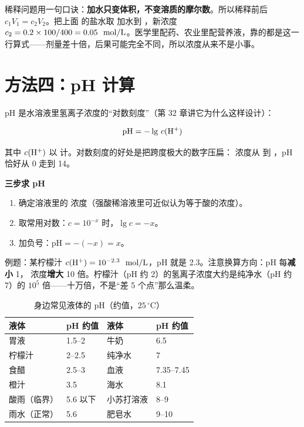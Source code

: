 稀释问题用一句口诀：\textbf{加水只变体积，不变溶质的摩尔数}。所以稀释前后 $c_1V_1 = c_2V_2$。把上面  的盐水取  加水到 ，新浓度 $c_2 = 0.2\times100/400 = 0.05\ \ud{}{mol/L}$。医学里配药、农业里配营养液，靠的都是这一行算式——剂量差十倍，后果可能完全不同，所以浓度从来不是小事。

\section{方法四：pH 计算}

pH 是水溶液里氢离子浓度的“对数刻度”（第 32 章讲它为什么这样设计）：

\[
\mathrm{pH} = -\lg\,c(\mathrm{H^+})
\]

其中 $c(\mathrm{H^+})$ 以  计。对数刻度的好处是把跨度极大的数字压扁： 浓度从  到 ，pH 恰好从 0 走到 14。

\textbf{三步求 pH}

\begin{enumerate}[itemsep=2pt]
\item 确定溶液里的  浓度（强酸稀溶液里可近似认为等于酸的浓度）。
\item 取常用对数：$c = 10^{-x}$ 时，$\lg c = -x$。
\item 加负号：$\mathrm{pH} = -(-x) = x$。
\end{enumerate}

例题：某柠檬汁 $c(\chem{H^+}) = 10^{-2.3}\ \ud{}{mol/L}$，pH 就是 2.3。注意换算方向：pH 每\textbf{减小} 1， 浓度\textbf{增大} 10 倍。柠檬汁（pH 约 2）的氢离子浓度大约是纯净水（pH 约 7）的 $10^5$ 倍——十万倍，不是“差 5 个点”那么温柔。

\begin{table}[htbp]
\centering
\caption{身边常见液体的 pH（约值，$25\,^{\circ}\mathrm{C}$）}
\begin{tabular}{llll}
\toprule
液体 & pH 约值 & 液体 & pH 约值 \\
\midrule
胃液 & 1.5--2 & 牛奶 & 6.5 \\
柠檬汁 & 2--2.5 & 纯净水 & 7 \\
食醋 & 2.5--3 & 血液 & 7.35--7.45 \\
橙汁 & 3.5 & 海水 & 8.1 \\
酸雨（临界） & 5.6 以下 & 小苏打溶液 & 8--9 \\
雨水（正常） & 5.6 & 肥皂水 & 9--10 \\
\bottomrule
\end{tabular}
\end{table}

